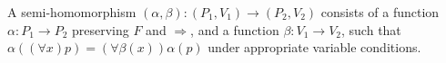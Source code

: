 A semi-homomorphism $(\alpha, \beta): (P_1, V_1) \to (P_2, V_2)$ consists of a function $\alpha: P_1 \to P_2$ preserving $F$ and $\Rightarrow$, and a function $\beta: V_1 \to V_2$, such that $\alpha((\forall x)p) = (\forall \beta(x))\alpha(p)$ under appropriate variable conditions.
